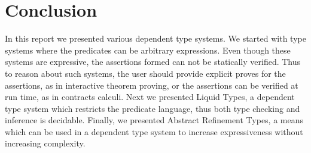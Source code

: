 \section{Conclusion}
In this report we presented various dependent type systems.
We started with type systems where the predicates can be arbitrary expressions.
Even though these systems are expressive, the assertions formed can not be statically
verified. Thus to reason about such systems, the user should provide explicit proves
for the assertions, as in interactive theorem proving, 
or the assertions can be verified at run time, as in contracts calculi.
Next we presented Liquid Types, a dependent type system 
which restricts the predicate language, thus both type checking and inference
is decidable.
Finally, we presented Abstract Refinement Types, a means which can be used
in a dependent type system to increase expressiveness without increasing complexity.